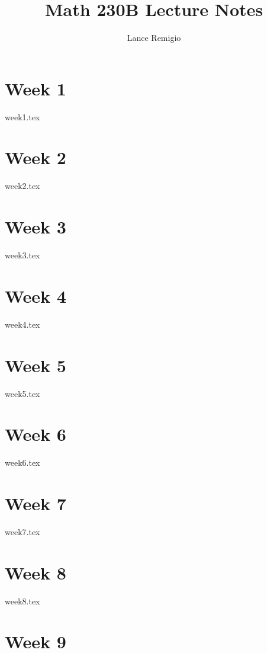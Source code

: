 \documentclass[a4paper]{article}
\title{Math 230B Lecture Notes}
\author{Lance Remigio}
\begin{document}
\maketitle
\tableofcontents

\section{Week 1}

{week1.tex}

\section{Week 2}

{week2.tex}

\section{Week 3}

{week3.tex}

\section{Week 4}

{week4.tex}

\section{Week 5}

{week5.tex}

\section{Week 6}

{week6.tex}

\section{Week 7}

{week7.tex}

\section{Week 8}

{week8.tex}

\section{Week 9}
\end{document}
